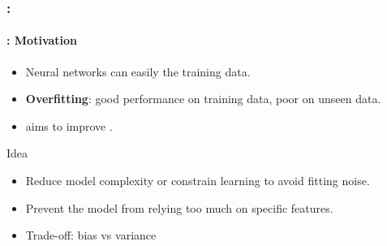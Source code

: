 \documentclass[xcolor=table]{beamer}
\begin{document}
\begin{frame}
	\frametitle{\insertshortsubtitle: \insertsection}
	\framesubtitle{\insertsubsection: Motivation}
	
	\begin{itemize}
		\item Neural networks can easily  the training data.
		\item \textbf{Overfitting}: good performance on training data, poor on unseen data.
		\item {} aims to improve .
	\end{itemize}
	
	\begin{block}{Idea}
		\begin{itemize}
			\item Reduce model complexity or constrain learning to avoid fitting noise.
			\item Prevent the model from relying too much on specific features.
		\end{itemize}
		
	\end{block}
	
	\begin{itemize}
		\item Trade-off: bias vs variance
	\end{itemize}
	
\end{frame}
\end{document}
